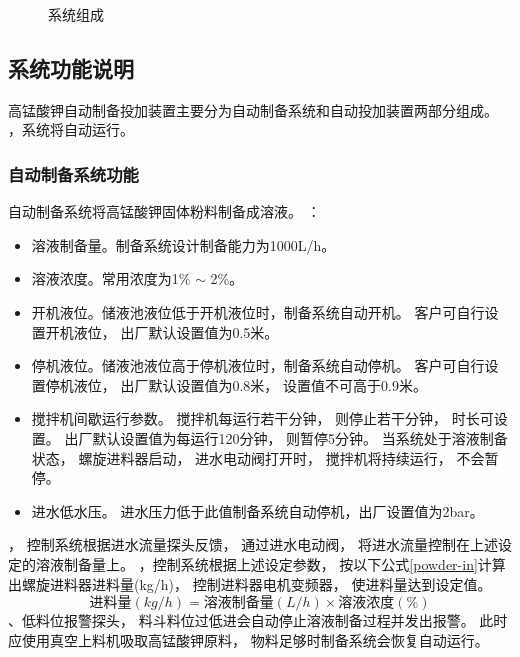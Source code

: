 \documentclass[UTF8,a4paper,12pt,titlepage]{ctexart}
\begin{document}
\begin{figure}[h]
         \caption{系统组成}\label{fig:p2}
      \end{figure}

   \subsection{系统功能说明}
      高锰酸钾自动制备投加装置主要分为自动制备系统和自动投加装置两部分组成。
      ，系统将自动运行。
      \subsubsection{自动制备系统功能}
         自动制备系统将高锰酸钾固体粉料制备成溶液。
         ：
         \begin{itemize}
            \item 溶液制备量。制备系统设计制备能力为1000L/h。
            \item 溶液浓度。常用浓度为1\% $\sim$ 2\%。
            \item 开机液位。储液池液位低于开机液位时，制备系统自动开机。
               客户可自行设置开机液位，
               出厂默认设置值为0.5米。
            \item 停机液位。储液池液位高于停机液位时，制备系统自动停机。
               客户可自行设置停机液位，
               出厂默认设置值为0.8米，
               设置值不可高于0.9米。
            \item 搅拌机间歇运行参数。
            搅拌机每运行若干分钟，
            则停止若干分钟，
            时长可设置。
            出厂默认设置值为每运行120分钟，
            则暂停5分钟。
            当系统处于溶液制备状态，
            螺旋进料器启动，
            进水电动阀打开时，
            搅拌机将持续运行，
            不会暂停。
            \item 进水低水压。
            进水压力低于此值制备系统自动停机，出厂设置值为2bar。
         \end{itemize}
         ，
         控制系统根据进水流量探头反馈，
         通过进水电动阀，
         将进水流量控制在上述设定的溶液制备量上。
         ，控制系统根据上述设定参数，
         按以下公式\ref{powder-in}计算出螺旋进料器进料量(kg/h)，
         控制进料器电机变频器，
         使进料量达到设定值。
         \begin{equation}
            \label{powder-in}
            \mbox{进料量}(kg/h) = \mbox{溶液制备量}(L/h)  \times \mbox{溶液浓度} (\%)
         \end{equation}
         、低料位报警探头，
         料斗料位过低进会自动停止溶液制备过程并发出报警。
         此时应使用真空上料机吸取高锰酸钾原料，
         物料足够时制备系统会恢复自动运行。
\end{document}
